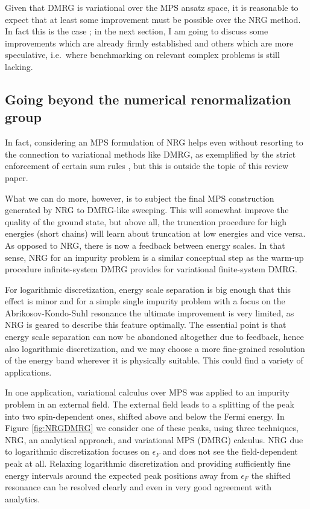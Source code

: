 \documentclass[a4paper,10pt,oneside,onecolumn,1p,times]{elsarticle}
\begin{document}
Given that DMRG is variational over the MPS ansatz space, it is reasonable to expect that at least some improvement must be possible over the NRG method. In fact this is the case \cite{Weichselbaum09}; in the next section, I am going to discuss some improvements which are already firmly established and others which are more speculative, i.e.\ where benchmarking on relevant complex problems is still lacking. 

\subsection{Going beyond the numerical renormalization group}
In fact, considering an MPS formulation of NRG helps even without resorting to the connection to variational methods like DMRG, as exemplified by the strict enforcement of certain sum rules \cite{Weichselbaum07,Peters06}, but this is outside the topic of this review paper. 

What we can do more, however, is to subject the final MPS construction generated by NRG to DMRG-like sweeping. This will somewhat improve the quality of the ground state, but above all, the truncation procedure for high energies (short chains) will learn about truncation at low energies and vice versa. As opposed to NRG, there is now a feedback between energy scales. In that sense, NRG for an impurity problem is a similar conceptual step as the warm-up procedure infinite-system DMRG provides for variational finite-system DMRG. 

For logarithmic discretization, energy scale separation is big enough that this effect is minor and for a simple single impurity problem with a focus on the Abrikosov-Kondo-Suhl resonance the ultimate improvement is very limited, as NRG is geared to describe this feature optimally. The essential point is that energy scale separation can now be abandoned altogether due to feedback, hence also logarithmic discretization, and we may choose a more fine-grained resolution of the energy band wherever it is physically suitable. This could find a variety of applications.

In one application, variational calculus over MPS was applied to an impurity problem in an external field. The external field leads to a splitting of the peak into two spin-dependent ones, shifted above and below the Fermi energy. In Figure \ref{fig:NRGDMRG} we consider one of these peaks, using three techniques, NRG, an analytical approach\cite{Rosch03,Garst05}, and variational MPS (DMRG) calculus. NRG due to logarithmic discretization focuses on $\epsilon_F$ and does not see the field-dependent peak at all. Relaxing logarithmic discretization and providing sufficiently fine energy intervals around the expected peak positions away from $\epsilon_F$ the shifted resonance can be resolved clearly and even in very good agreement with analytics.
\end{document}
